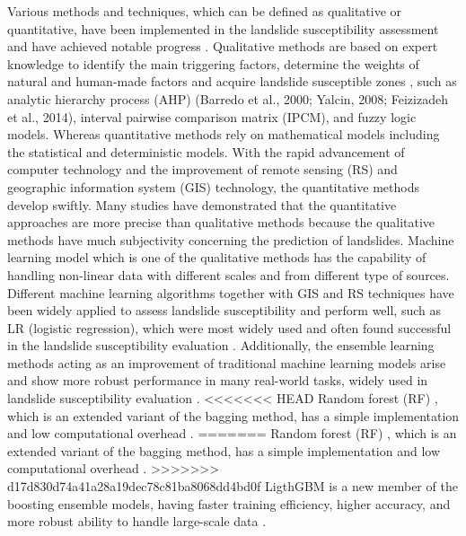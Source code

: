 \documentclass[a4paper,fleqn]{cas-sc}
\begin{document}
Various methods and techniques, which can be defined as qualitative or quantitative, have been implemented in the landslide susceptibility assessment and have achieved notable progress \citep{Fang2020IJoGIS,Guzzetti_1999_Geomorphology,Bui2020Catena}. 
Qualitative methods are based on expert knowledge to identify the main triggering factors, determine the weights of natural and human-made factors and acquire landslide susceptible zones \citep{Aditian2018Geomorphology}, such as analytic hierarchy process (AHP) (Barredo et al., 2000; Yalcin, 2008; Feizizadeh et al., 2014)\citep{Barredo2000IJoAEOaG,Yalcin2008Catena}, interval pairwise comparison matrix (IPCM)\citep{Ghorbanzadeh2019RemoteSensing}, and fuzzy logic models\citep{Aksoy2012Computers&Geosciences,Anbalagan2015GeoenvironmentalDisasters,Shahabi2015EnvironmentalEarthSciences,Roy2019RemoteSensingApplicationsSocietyandEnvironment}. 
Whereas quantitative methods rely on mathematical models including the statistical and deterministic models\citep{Abuzied2016JoMS, Reichenbach2018ER,Fang2020IJoGIS}. 
With the rapid advancement of computer technology and the improvement of remote sensing (RS) and geographic information system (GIS) technology, the quantitative methods develop swiftly. 
Many studies have demonstrated that the quantitative approaches are more precise than qualitative methods because the qualitative methods have much subjectivity concerning the prediction of landslides\citep{Aditian2018Geomorphology, Bui2020Catena}. 
Machine learning model which is one of the qualitative methods has the capability of handling non-linear data with different scales and from different type of sources\citep{Bui2020Catena}. 
Different machine learning algorithms together with GIS and RS techniques have been widely applied to assess landslide susceptibility and perform well, such as LR (logistic regression), which were most widely used and often found successful in the landslide susceptibility evaluation \citep{Ayalew2005Geomorphology,Eeckhaut2006Geomorphology,Bai2010Geomorphology,Akgun2012Landslides,Sevgen2019S,Dag2020EES}. 
Additionally, the ensemble learning methods acting as an improvement of traditional machine learning models arise and show more robust performance in many real-world tasks, widely used in landslide susceptibility evaluation \citep{Althuwaynee2014Landslides,Napoli2020Landslides,Hong2020SoTTE,Saha2021SoTTE}. 
<<<<<<< HEAD
Random forest (RF) \citep{Breiman2001}, which is an extended variant of the bagging method, has a simple implementation and low computational overhead \cite{Youssef2015Landslides, Kim2017GI}. 
=======
Random forest (RF) \citep{Breiman2001}, which is an extended variant of the bagging method, has a simple implementation and low computational overhead \citep{Youssef2015Landslides, Kim2017GI}. 
>>>>>>> d17d830d74a41a28a19dec78c81ba8068dd4bd0f
LigthGBM is a new member of the boosting ensemble models, having faster training efficiency, higher accuracy, and more robust ability to handle large-scale data \citep{Song2018}. 
\end{document}
